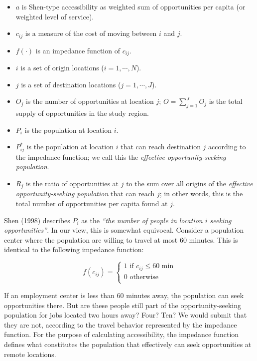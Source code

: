 \documentclass[]{elsarticle} %
\providecommand{\tightlist}{%
  \setlength{\itemsep}{0pt}\setlength{\parskip}{0pt}}
\begin{document}
\begin{itemize}
\tightlist
\item
  \(a\) is Shen-type accessibility as weighted sum of opportunities per
  capita (or weighted level of service).
\item
  \(c_{ij}\) is a measure of the cost of moving between \(i\) and \(j\).
\item
  \(f(\cdot)\) is an impedance function of \(c_{ij}\).
\item
  \(i\) is a set of origin locations (\(i = 1,\cdots,N\)).
\item
  \(j\) is a set of destination locations (\(j = 1,\cdots,J\)).
\item
  \(O_j\) is the number of opportunities at location \(j\);
  \(O = \sum_{j=1}^J O_j\) is the total supply of opportunities in the
  study region.
\item
  \(P_i\) is the population at location \(i\).
\item
  \(P_{ij}^*\) is the population at location \(i\) that can reach
  destination \(j\) according to the impedance function; we call this
  the \emph{effective opportunity-seeking population}.
\item
  \(R_j\) is the ratio of opportunities at \(j\) to the sum over all
  origins of the \emph{effective opportunity-seeking population} that
  can reach \(j\); in other words, this is the total number of
  opportunities per capita found at \(j\).
\end{itemize}

Shen (1998) describes \(P_i\) as the \emph{``the number of people in
location \(i\) seeking opportunities''}. In our view, this is somewhat
equivocal. Consider a population center where the population are willing
to travel at most 60 minutes. This is identical to the following
impedance function:

\begin{equation}
\label{eq:binary-impedance}
f(c_{ij}) =
\begin{cases}
1\text{ if }c_{ij}\leq60\text{ min}\\
0\text{ otherwise}\\
\end{cases}
\end{equation}

If an employment center is less than 60 minutes away, the population can
seek opportunities there. But are these people still part of the
opportunity-seeking population for jobs located two hours away? Four?
Ten? We would submit that they are not, according to the travel behavior
represented by the impedance function. For the purpose of calculating
accessibility, the impedance function defines what constitutes the
population that effectively can seek opportunities at remote locations.
\end{document}

